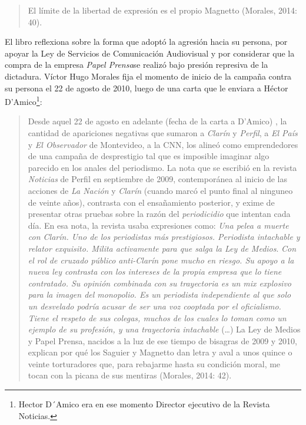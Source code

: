 \begin{quote}
El límite de la libertad de expresión es el propio Magnetto (Morales, 2014: 40).
\end{quote}

El libro reflexiona sobre la forma que adoptó la agresión hacia su persona, por apoyar la Ley de Servicios de Comunicación Audiovisual y por considerar que la compra de la empresa \emph{Papel Prensa}se realizó bajo presión represiva de la dictadura. Víctor Hugo Morales fija el momento de inicio de la campaña contra su persona el 22 de agosto de 2010, luego de una carta que le enviara a Héctor D'Amico\footnote{Hector D´Amico era en ese momento Director ejecutivo de la Revista Noticias.}:

\begin{quote}
Desde aquel 22 de agosto en adelante (fecha de la carta a D'Amico) , la cantidad de apariciones negativas que sumaron a \emph{Clarín} y \emph{Perfil}, a \emph{El País} y \emph{El Observador} de Montevideo, a la CNN, los alineó como emprendedores de una campaña de desprestigio tal que es imposible imaginar algo parecido en los anales del periodismo. La nota que se escribió en la revista \emph{Noticias} de Perfil en septiembre de 2009, contemporánea al inicio de las acciones de \emph{La Nación} y \emph{Clarín} (cuando marcó el punto final al ninguneo de veinte años), contrasta con el ensañamiento posterior, y exime de presentar otras pruebas sobre la razón del \emph{periodicidio} que intentan cada día. En esa nota, la revista usaba expresiones como: \emph{Una pelea a muerte con Clarín. Uno de los periodistas más prestigiosos. Periodista intachable y relator exquisito. Milita activamente para que salga la Ley de Medios}. \emph{Con el rol de cruzado público anti-Clarín pone mucho en riesgo. Su apoyo a la nueva ley contrasta con los intereses de la propia empresa que lo tiene contratado. Su opinión combinada con su trayectoria es un mix explosivo para la imagen del monopolio. Es un periodista independiente al que solo un desvelado podría acusar de ser una voz cooptada por el oficialismo. Tiene el respeto de sus colegas, muchos de los cuales lo toman como un ejemplo de su profesión, y una trayectoria intachable} (\ldots) La Ley de Medios y Papel Prensa, nacidos a la luz de ese tiempo de bisagras de 2009 y 2010, explican por qué los Saguier y Magnetto dan letra y aval a unos quince o veinte torturadores que, para rebajarme hasta su condición moral, me tocan con la picana de sus mentiras (Morales, 2014: 42).
\end{quote}

